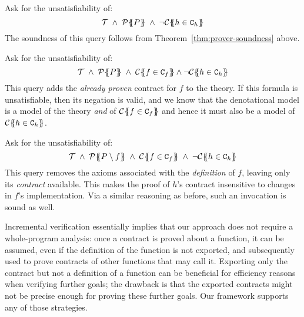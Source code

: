 \begin{itemize*}
  \item Ask for the unsatisfiability of: 
    \[  \Th\; \land \; \ptrans{\Sigma}{P} \; \land \;\neg\ctrans{\Sigma}{P}{h \in \Ct_h} \]
        The soundness of this query follows from Theorem~\ref{thm:prover-soundness} above.

  \item Ask for the unsatisfiability of:
    \[  \Th \; \land\; \ptrans{\Sigma}{P} \; \land \; \ctrans{\Sigma}{P}{f \in \Ct_f} \land \neg \ctrans{\Sigma}{P}{h \in \Ct_h} \]
        This query adds the {\em already proven} contract for $f$ to the theory. If this formula
        is unsatisfiable, then its negation is valid, and we know that the denotational model is 
        a model of the theory {\em and} of $\ctrans{\Sigma}{P}{f \in \Ct_f}$ and hence it must also
        be a model of $\ctrans{\Sigma}{P}{h \in \Ct_h}$.
  \item Ask for the unsatisfiability of:
    \[  \Th \; \land \; 
        \ptrans{\Sigma}{P \setminus f} \; \land \; 
        \ctrans{\Sigma}{P}{f \in \Ct_f} \; \land \;
        \neg\ctrans{\Sigma}{P}{h \in \Ct_h} \]
        This query removes the axioms associated with the \emph{definition} of $f$, leaving
        only its \emph{contract} available.  This makes the proof of $h$'s contract
        insensitive to changes in $f$'s implementation.
        Via a similar reasoning as before, such an invocation 
        is sound as well.
\end{itemize*}

Incremental verification essentially implies that our approach does not require a
whole-program analysis: once a contract is proved about a function, it can be assumed,
even if the definition of the function is not exported, and subsequently used to prove
contracts of other functions that may call it. Exporting only the contract but not a 
definition of a function can be beneficial for efficiency reasons when verifying further
goals; the drawback is that the exported contracts might not be precise enough for proving
these further goals. Our framework supports any of those strategies.



